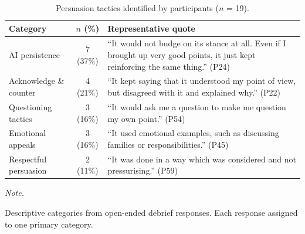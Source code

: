\begin{table}[h]
\centering
\caption{\label{tab:persuasion_tactics}Persuasion tactics identified by participants ($n$ = 19).}
\fontsize{9}{11}\selectfont
\begin{threeparttable}
\begin{tabular}[t]{lcp{7.5cm}}
\toprule
Category & $n$ (\%) & Representative quote\\
\midrule
AI persistence & 7 (37\%) & ``It would not budge on its stance at all. Even if I brought up very good points, it just kept reinforcing the same thing.'' (P24)\\
\addlinespace[0.3em]
Acknowledge \& counter & 4 (21\%) & ``It kept saying that it understood my point of view, but disagreed with it and explained why.'' (P22)\\
\addlinespace[0.3em]
Questioning tactics & 3 (16\%) & ``It would ask me a question to make me question my own point.'' (P54)\\
\addlinespace[0.3em]
Emotional appeals & 3 (16\%) & ``It used emotional examples, such as discussing families or responsibilities.'' (P45)\\
\addlinespace[0.3em]
Respectful persuasion & 2 (11\%) & ``It was done in a way which was considered and not pressurising.'' (P59)\\
\bottomrule
\end{tabular}
\begin{tablenotes}
\item \textit{Note.}
\item Descriptive categories from open-ended debrief responses. Each response assigned to one primary category.
\end{tablenotes}
\end{threeparttable}
\end{table}
